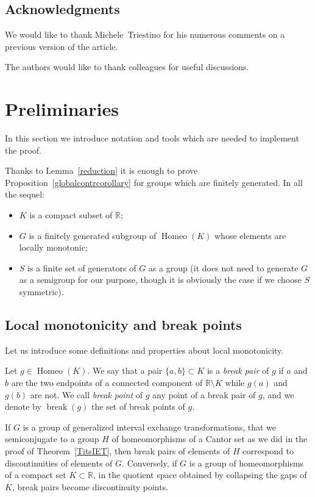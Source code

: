 \documentclass[AHL,Unicode,longabstracts,published]{cedram}
\DeclareMathOperator{\breaKk}{break}
\DeclareMathOperator{\Homeo}{Homeo}
\newcommand{\R}{\mathbb{R}}
\newcounter{setofcase}
\newcounter{case}[setofcase]
\newcommand{\R}{\mathbb{R}}
\begin{document}
\subsection*{Acknowledgments}
We would like to thank Michele~Triestino for his numerous comments on a previous version of the article.

The authors would like to thank colleagues for useful discussions.

\pagebreak
\section{Preliminaries}\label{pre}

In this section we introduce notation and tools which are needed to implement the proof.

Thanks to Lemma~\ref{reduction} it is enough to prove Proposition~\ref{globalcontrcorollary} for groups which are finitely generated. In all the sequel:
\begin{itemize}
\item $K$ is a compact subset of $\R$;
\item $G$ is a finitely generated subgroup of $\Homeo(K)$ whose elements are locally monotonic;
\item $S$ is a finite set of generators of $G$ as a group (it does not need to generate $G$ as a semigroup for our purpose, though it is obviously the case if we choose $S$ symmetric).
\end{itemize}

\subsection{Local monotonicity and break points}

Let us introduce some definitions and properties about local monotonicity.

\begin{defi}
Let $g \in \Homeo(K)$. We say that a pair $\{a,b\}\subset K$ is a \emph{break pair} of $g$ if $a$ and $b$ are the two endpoints of a connected component of $\R \setminus K$ while $g(a)$ and $g(b)$ are not. We call \emph{break point} of $g$ any point of a break pair of $g$, and we denote by $\breaKk(g)$ the set of break points of $g$.
\end{defi}

\begin{rema}
If $G$ is a group of generalized interval exchange transformations, that we semiconjugate to a group $H$ of homeomorphisms of a Cantor set as we did in the proof of Theorem~\ref{TitsIET}, then break pairs of elements of $H$ correspond to discontinuities of elements of $G$. Conversely, if $G$ is a group of homeomorphisms of a compact set $K\subset \R$, in the quotient space obtained by collapsing the gaps of $K$, break pairs become discontinuity points.
\end{rema}
\end{document}
